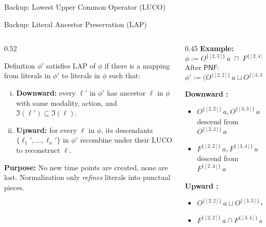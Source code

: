 \documentclass[9pt,aspectratio=169]{beamer}
\newcommand{\is}{\ensuremath{\mathfrak{I}}}
\newcommand{\dpnf}{\ensuremath{\mathsf{DPNF}}}
\newcommand{\pnf}{\ensuremath{\mathsf{PNF}}}
\newcommand{\LUCO}{\ensuremath{\mathrm{LUCO}}\xspace}
\newcommand{\LAP}{\ensuremath{\mathrm{LAP}}\xspace}
\newcommand{\ob}[2]{\ensuremath{O^{#1}\,#2}}
\newcommand{\forbb}[2]{\ensuremath{F^{#1}\,#2}}
\begin{document}
\begin{frame}{Backup: Lowest Upper Common Operator (\LUCO)}
\end{frame}

\begin{frame}{Backup: Literal Ancestor Preservation (\LAP)}
\small
\begin{columns}[T]
\begin{column}{0.52\textwidth}
  \begin{block}{Definition}
    $\phi'$ satisfies \LAP of $\phi$ if there is a mapping from literals in $\phi'$ to literals in $\phi$ such that:
    \begin{enumerate}[(i)]
      \item \textbf{Downward:} every $\ell'$ in $\phi'$ has ancestor $\ell$ in $\phi$ with same modality, action, and $\is(\ell') \subseteq \is(\ell)$.
      \item \textbf{Upward:} for every $\ell$ in $\phi$, its descendants $\{\ell_1',\dots,\ell_n'\}$ in $\phi'$ recombine under their \LUCO to reconstruct $\ell$.
    \end{enumerate}
  \end{block}
  \medskip
  \textbf{Purpose:} No new time points are created, none are lost. Normalization only \emph{refines} literals into punctual pieces.
\end{column}
\begin{column}{0.45\textwidth}
  \textbf{Example:}
  \[
  \phi := \ob{\{[2,3]\}}{a} \;\sqcap\; \forbb{\{[2,4]\}}{a}
  \]
  After $\pnf$:
  \[
  \phi' := \big(\ob{\{[2,2]\}}{a} \sqcup \ob{\{[3,3]\}}{a}\big) \sqcap \forbb{\{[2,2]\}}{a} \sqcap \forbb{\{[3,4]\}}{a}
  \]

  \footnotesize
  \textbf{Downward \checkmark:}
  \begin{itemize}\setlength\itemsep{1pt}
    \item $\ob{\{[2,2]\}}{a}, \ob{\{[3,3]\}}{a}$ descend from $\ob{\{[2,3]\}}{a}$
    \item $\forbb{\{[2,2]\}}{a}, \forbb{\{[3,4]\}}{a}$ descend from $\forbb{\{[2,4]\}}{a}$
  \end{itemize}
  \textbf{Upward \checkmark:}
  \begin{itemize}\setlength\itemsep{1pt}
    \item $\ob{\{[2,2]\}}{a} \sqcup \ob{\{[3,3]\}}{a} \equiv \ob{\{[2,3]\}}{a}$
    \item $\forbb{\{[2,2]\}}{a} \sqcap \forbb{\{[3,4]\}}{a} \equiv \forbb{\{[2,4]\}}{a}$
  \end{itemize}
\end{column}
\end{columns}

\vspace{3mm}
\centering
{}
\end{frame}
\end{document}
